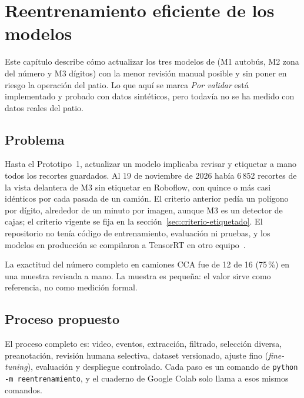 \chapter{Reentrenamiento eficiente de los modelos}
\label{cap:reentrenamiento}

Este capítulo describe cómo actualizar los tres modelos de \saru{}
(M1 autobús, M2 zona del número y M3 dígitos) con la menor revisión
manual posible y sin poner en riesgo la operación del patio. Lo que aquí
se marca \emph{Por validar} está implementado y probado con datos
sintéticos, pero todavía no se ha medido con datos reales del patio.

\section{Problema}

Hasta el Prototipo~1, actualizar un modelo implicaba revisar y etiquetar
a mano todos los recortes guardados. Al 19 de noviembre de 2026 había
6\,852 recortes de la vista delantera de M3 sin etiquetar en Roboflow,
con quince o más casi idénticos por cada pasada de un camión. El criterio
anterior pedía un polígono por dígito, alrededor de un minuto por imagen,
aunque M3 es un detector de cajas; el criterio vigente se fija en la
sección~\ref{sec:criterio-etiquetado}. El repositorio no tenía código de
entrenamiento, evaluación ni pruebas, y los modelos en producción se
compilaron a TensorRT en otro equipo~\cite{tensorrt}.

\begin{aviso}
La exactitud del número completo en camiones CCA fue de 12 de 16
(75\,\%) en una muestra revisada a mano. La muestra es pequeña: el valor
sirve como referencia, no como medición formal.
\end{aviso}

\section{Proceso propuesto}

El proceso completo es: video, eventos, extracción, filtrado, selección
diversa, preanotación, revisión humana selectiva, dataset versionado,
ajuste fino (\emph{fine-tuning}), evaluación y despliegue controlado.
Cada paso es un comando de \texttt{python -m reentrenamiento}, y el
cuaderno de Google Colab solo llama a esos mismos comandos.

